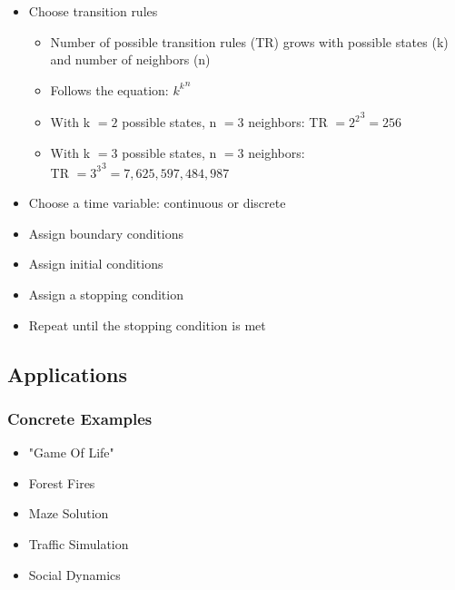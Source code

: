 \documentclass{beamer}
\begin{document}
\frame
{
 \begin{itemize}
  \item<1-> Choose transition rules 
  	\begin{itemize}
	\item Number of possible transition rules (TR) grows with possible states (k) and number of neighbors (n)
	\item Follows the equation: ${k^{k}}^{n}$
	\item With k $= 2$ possible states, n $= 3$ neighbors:  TR $= {2^{2}}^{3} = 256$ 
	\item With k $= 3$ possible states, n $= 3$ neighbors: \\ TR $= {3^{3}}^{3} = 7,625,597,484,987$	
	\end{itemize}
  \item<2-> Choose a time variable: continuous or discrete
  \item<3-> Assign boundary conditions
  \item<4-> Assign initial conditions
  \item<5-> Assign a stopping condition
  \item<6-> Repeat until the stopping condition is met
  \end{itemize}
}


\subsection{Applications}
\frame
{
  \frametitle{Concrete Examples}

  \begin{itemize}
  \item "Game Of Life"
  \item Forest Fires
  \item Maze Solution 
  \item Traffic Simulation
  \item Social Dynamics
  \end{itemize}

}
\end{document}

